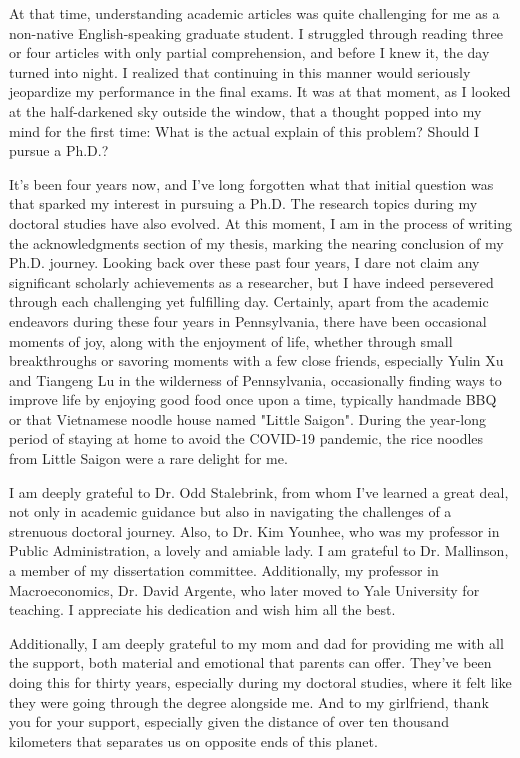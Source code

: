 At that time, understanding academic articles was quite challenging for me as a non-native English-speaking graduate student. I struggled through reading three or four articles with only partial comprehension, and before I knew it, the day turned into night. I realized that continuing in this manner would seriously jeopardize my performance in the final exams. It was at that moment, as I looked at the half-darkened sky outside the window, that a thought popped into my mind for the first time: What is the actual explain of this problem? Should I pursue a Ph.D.?

It's been four years now, and I've long forgotten what that initial question was that sparked my interest in pursuing a Ph.D. The research topics during my doctoral studies have also evolved. At this moment, I am in the process of writing the acknowledgments section of my thesis, marking the nearing conclusion of my Ph.D. journey. Looking back over these past four years, I dare not claim any significant scholarly achievements as a researcher, but I have indeed persevered through each challenging yet fulfilling day. Certainly, apart from the academic endeavors during these four years in Pennsylvania, there have been occasional moments of joy, along with the enjoyment of life, whether through small breakthroughs or savoring moments with a few close friends, especially Yulin Xu and Tiangeng Lu in the wilderness of Pennsylvania, occasionally finding ways to improve life by enjoying good food once upon a time, typically handmade BBQ or that Vietnamese noodle house named "Little Saigon". During the year-long period of staying at home to avoid the COVID-19 pandemic, the rice noodles from Little Saigon were a rare delight for me.

I am deeply grateful to Dr. Odd Stalebrink, from whom I've learned a great deal, not only in academic guidance but also in navigating the challenges of a strenuous doctoral journey. Also, to Dr. Kim Younhee, who was my professor in Public Administration, a lovely and amiable lady. I am grateful to Dr. Mallinson, a member of my dissertation committee. Additionally, my professor in Macroeconomics, Dr. David Argente, who later moved to Yale University for teaching. I appreciate his dedication and wish him all the best.

Additionally, I am deeply grateful to my mom and dad for providing me with all the support, both material and emotional that parents can offer. They've been doing this for thirty years, especially during my doctoral studies, where it felt like they were going through the degree alongside me. And to my girlfriend, thank you for your support, especially given the distance of over ten thousand kilometers that separates us on opposite ends of this planet.

